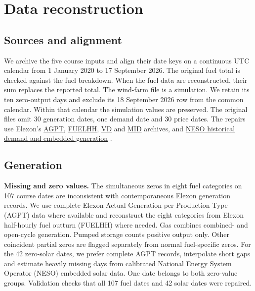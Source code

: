 \chapter{Data reconstruction}\label{app:data}
\section{Sources and alignment}
We archive the five course inputs and align their date keys on a continuous
UTC calendar from 1 January 2020 to 17 September 2026. The original fuel
total is checked against the fuel breakdown. When the fuel data are
reconstructed, their sum replaces the reported total. The wind-farm file is
a simulation. We retain its ten zero-output days and exclude its 18 September
2026 row from the common calendar. Within that calendar the simulation
values are preserved. The original files omit 30 generation dates,
one demand date and 30 price dates. The repairs use Elexon's
\href{https://bmrs.elexon.co.uk/api-documentation/endpoint/generation/actual/per-type}{AGPT},
\href{https://bmrs.elexon.co.uk/api-documentation/endpoint/datasets/FUELHH}{FUELHH},
\href{https://bmrs.elexon.co.uk/api-documentation/endpoint/demand/outturn/summary}{VD}
and \href{https://bmrs.elexon.co.uk/api-documentation/endpoint/datasets/MID}{MID}
archives, and \href{https://www.neso.energy/data-portal/historic-demand-data}
{NESO historical demand and embedded generation} \cite{repair}.

\section{Generation}
\textbf{Missing and zero values.}
The simultaneous zeros in eight fuel categories on 107 course dates are
inconsistent with contemporaneous Elexon generation records. We use
complete Elexon Actual Generation per Production Type (AGPT) data where
available and reconstruct the eight categories from Elexon half-hourly
fuel outturn (FUELHH) where needed. Gas combines combined- and
open-cycle generation. Pumped storage counts positive output only.
Other coincident partial zeros are flagged separately from normal
fuel-specific zeros. For the 42 zero-solar dates, we prefer complete AGPT
records, interpolate short gaps and estimate heavily missing days from
calibrated National Energy System Operator (NESO) embedded solar data.
One date belongs to both zero-value groups. Validation checks that all
107 fuel dates and 42 solar dates were repaired.


